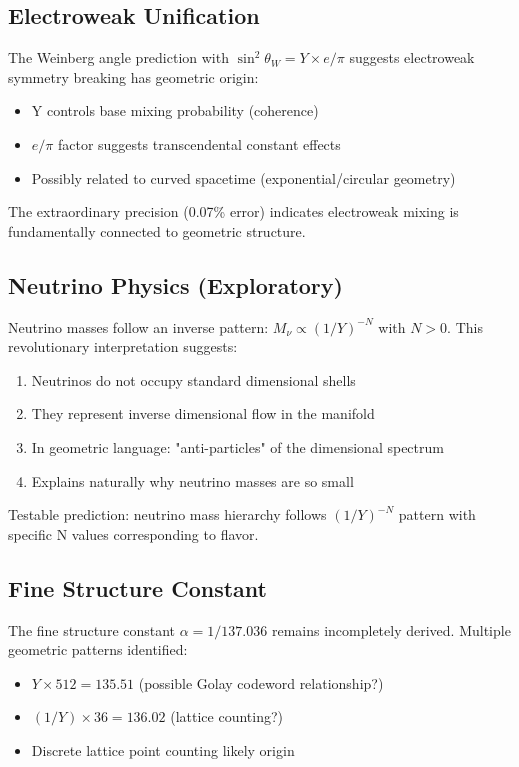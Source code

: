 \documentclass[11pt,twocolumn]{article}
\begin{document}
\subsection{Electroweak Unification}

The Weinberg angle prediction with $\sin^2\theta_W = Y \times e/\pi$ suggests electroweak symmetry breaking has geometric origin:

\begin{itemize}
\item Y controls base mixing probability (coherence)
\item $e/\pi$ factor suggests transcendental constant effects
\item Possibly related to curved spacetime (exponential/circular geometry)
\end{itemize}

The extraordinary precision (0.07\% error) indicates electroweak mixing is fundamentally connected to geometric structure.

\subsection{Neutrino Physics (Exploratory)}

Neutrino masses follow an inverse pattern: $M_\nu \propto (1/Y)^{-N}$ with $N > 0$. This revolutionary interpretation suggests:

\begin{enumerate}
\item Neutrinos do not occupy standard dimensional shells
\item They represent inverse dimensional flow in the manifold
\item In geometric language: "anti-particles" of the dimensional spectrum
\item Explains naturally why neutrino masses are so small
\end{enumerate}

Testable prediction: neutrino mass hierarchy follows $(1/Y)^{-N}$ pattern with specific N values corresponding to flavor.

\subsection{Fine Structure Constant}

The fine structure constant $\alpha = 1/137.036$ remains incompletely derived. Multiple geometric patterns identified:

\begin{itemize}
\item $Y \times 512 = 135.51$ (possible Golay codeword relationship?)
\item $(1/Y) \times 36 = 136.02$ (lattice counting?)
\item Discrete lattice point counting likely origin
\end{itemize}
\end{document}
